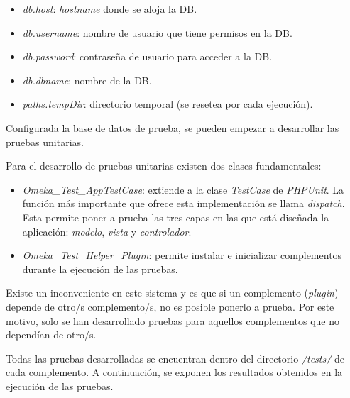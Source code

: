 \begin{itemize}
\tightlist
\item
  \emph{db.host}: \emph{hostname} donde se aloja la DB.
\item
  \emph{db.username}: nombre de usuario que tiene permisos en la DB.
\item
  \emph{db.password}: contraseña de usuario para acceder a la DB.
\item
  \emph{db.dbname}: nombre de la DB.
\item
  \emph{paths.tempDir}: directorio temporal (se resetea por cada
  ejecución).
\end{itemize}

Configurada la base de datos de prueba, se pueden empezar a desarrollar
las pruebas unitarias.

Para el desarrollo de pruebas unitarias existen dos clases
fundamentales:

\begin{itemize}
\tightlist
\item
  \emph{Omeka\_Test\_AppTestCase}: extiende a la clase \emph{TestCase}
  de \emph{PHPUnit}. La función más importante que ofrece esta
  implementación se llama \emph{dispatch}. Esta permite poner a prueba
  las tres capas en las que está diseñada la aplicación: \emph{modelo},
  \emph{vista} y \emph{controlador}.
\item
  \emph{Omeka\_Test\_Helper\_Plugin}: permite instalar e inicializar
  complementos durante la ejecución de las pruebas.
\end{itemize}

Existe un inconveniente en este sistema y es que si un complemento
(\emph{plugin}) depende de otro/s complemento/s, no es posible ponerlo a
prueba. Por este motivo, solo se han desarrollado pruebas para aquellos
complementos que no dependían de otro/s.

Todas las pruebas desarrolladas se encuentran dentro del directorio
\emph{/tests/} de cada complemento. A continuación, se exponen los
resultados obtenidos en la ejecución de las pruebas.

